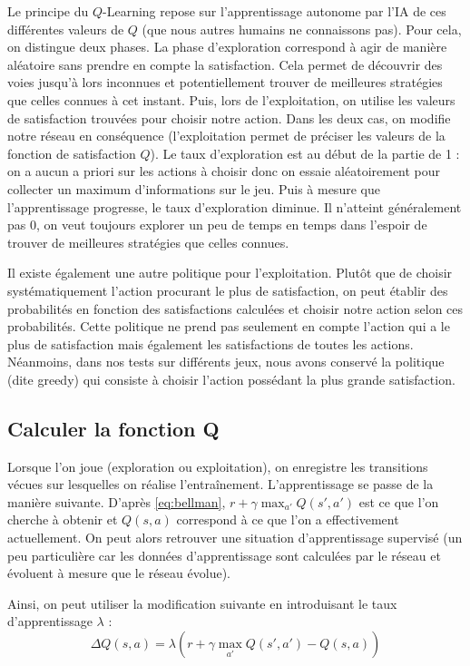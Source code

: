 Le principe du $Q$-Learning repose sur l'apprentissage autonome par l'IA de ces différentes valeurs de $Q$ (que nous autres humains ne connaissons pas). 
Pour cela, on distingue deux phases.
La phase d'exploration correspond à agir de manière aléatoire sans prendre en compte la satisfaction. Cela permet de découvrir des voies jusqu'à lors inconnues et 
potentiellement trouver de meilleures stratégies que celles connues à cet instant. Puis, lors de l'exploitation, on utilise les valeurs de satisfaction trouvées
pour choisir notre action. Dans les deux cas, on modifie notre réseau en conséquence (l'exploitation permet de préciser les valeurs de la fonction de satisfaction $Q$).
Le taux d'exploration est au début de la partie de 1 : on a aucun a priori sur les actions à choisir donc on essaie aléatoirement pour collecter un maximum d'informations
sur le jeu. Puis à mesure que l'apprentissage progresse, le taux d'exploration diminue. Il n'atteint généralement pas 0, on veut toujours explorer un peu de temps en temps
dans l'espoir de trouver de meilleures stratégies que celles connues. 

Il existe également une autre politique pour l'exploitation. Plutôt que de choisir systématiquement l'action procurant le plus de satisfaction, on peut
établir des probabilités en fonction des satisfactions calculées et choisir notre action selon ces probabilités. Cette politique ne prend pas seulement en compte
l'action qui a le plus de satisfaction mais également les satisfactions de toutes les actions. Néanmoins, dans nos tests sur différents jeux, nous avons conservé
la politique (dite greedy) qui consiste à choisir l'action possédant la plus grande satisfaction.

\subsection{Calculer la fonction Q}

Lorsque l'on joue (exploration ou exploitation), on enregistre les transitions vécues sur lesquelles on réalise l'entraînement. L'apprentissage se passe de la manière
suivante. D'après \ref{eq:bellman}, $r + \gamma \max_{a'} Q\left(s',a'\right)$ est ce que l'on cherche à obtenir et $Q\left(s,a\right)$ correspond à ce que l'on
a effectivement actuellement. On peut alors retrouver une situation d'apprentissage supervisé (un peu particulière car les données d'apprentissage sont calculées par 
le réseau et évoluent à mesure que le réseau évolue).

Ainsi, on peut utiliser la modification suivante en introduisant le taux d'apprentissage $\lambda$ : 
\begin{equation}
 \Delta Q\left(s,a\right) = \lambda\left(r + \gamma \max_{a'} Q\left(s',a'\right) - Q\left(s,a\right)\right)
 \label{eq:modif-bellman}
\end{equation}

